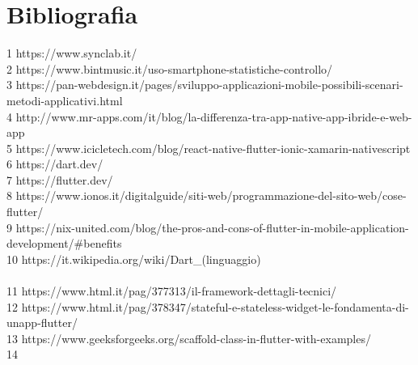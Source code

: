 

\cleardoublepage
\chapter{Bibliografia}

\nocite{*}
\printbibliography[heading=subbibliography,title={Riferimenti bibliografici},type=book]

\printbibliography[heading=subbibliography,title={Siti web consultati},type=online]

1 https://www.synclab.it/
\\
2 https://www.bintmusic.it/uso-smartphone-statistiche-controllo/
\\
3 https://pan-webdesign.it/pages/sviluppo-applicazioni-mobile-possibili-scenari-metodi-applicativi.html
\\
4 http://www.mr-apps.com/it/blog/la-differenza-tra-app-native-app-ibride-e-web-app
\\
5 https://www.icicletech.com/blog/react-native-flutter-ionic-xamarin-nativescript
\\
6 https://dart.dev/
\\
7 https://flutter.dev/
\\
8 https://www.ionos.it/digitalguide/siti-web/programmazione-del-sito-web/cose-flutter/
\\
9 https://nix-united.com/blog/the-pros-and-cons-of-flutter-in-mobile-application-development/\#benefits
\\
10 https://it.wikipedia.org/wiki/Dart\_(linguaggio)\\
\\
11 
https://www.html.it/pag/377313/il-framework-dettagli-tecnici/
\\
12 https://www.html.it/pag/378347/stateful-e-stateless-widget-le-fondamenta-di-unapp-flutter/
\\
13 https://www.geeksforgeeks.org/scaffold-class-in-flutter-with-examples/
\\
14








